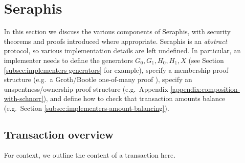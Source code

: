 \section{Seraphis}
\label{sec:seraphis}

In this section we discuss the various components of Seraphis, with security theorems and proofs introduced where appropriate. Seraphis is an {\em abstract} protocol, so various implementation details are left undefined. In particular, an implementer needs to define the generators $G_0, G_1, H_0, H_1, X$ (see Section \ref{subsec:implementers-generators} for example), specify a membership proof structure (e.g.\ a Groth/Bootle one-of-many proof \cite{bootle-one-of-many, triptych-preprint, nwk-paper...}), specify an unspentness/ownership proof structure (e.g.\ Appendix \ref{appendix:composition-with-schnorr}), and define how to check that transaction amounts balance (e.g.\ Section \ref{subsec:implementers-amount-balancing}).


\subsection{Transaction overview}
\label{subsec:seraphis-transaction-overview}

For context, we outline the content of a transaction here.

